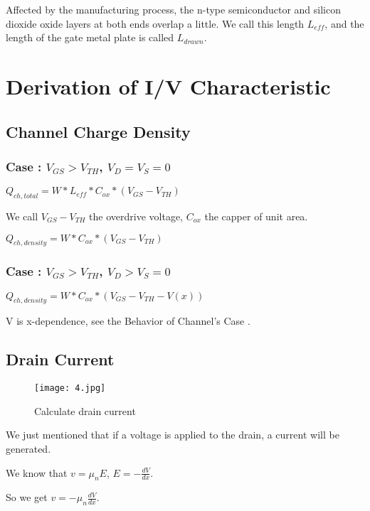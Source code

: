 \documentclass[fontset=windows]{article}
\begin{document}
Affected by the manufacturing process, the n-type semiconductor and silicon dioxide oxide layers at both ends overlap a little.
We call this length $L_{eff}$, and the length of the gate metal plate is called $L_{drawn}$.

\section*{Derivation of I/V Characteristic}

\subsection*{Channel Charge Density}

\subsubsection*{Case \uppercase\expandafter{}: $V_{GS}>V_{TH}$, $V_D=V_S=0$}

$Q_{ch,total}=W*L_{eff}*C_{ox}*(V_{GS}-V_{TH})$

We call $V_{GS}-V_{TH}$ the overdrive voltage, $C_{ox}$ the capper of unit area.

$Q_{ch,density}=W*C_{ox}*(V_{GS}-V_{TH})$

\subsubsection*{Case \uppercase\expandafter{}: $V_{GS}>V_{TH}$, $V_D>V_S=0$}

$Q_{ch,density}=W*C_{ox}*(V_{GS}-V_{TH}-V(x))$

V is x-dependence, see the Behavior of Channel's Case \uppercase\expandafter{}.

\subsection*{Drain Current}

\begin{figure}[htbp]
    \centering
    \texttt{[image: 4.jpg]}
    \captionsetup{labelformat=empty}
    \caption{Calculate drain current}
    \label{4}
\end{figure}

We just mentioned that if a voltage is applied to the drain, a current will be generated.

We know that $v=\mu_{n}E$, $E=-\frac{dV}{dx}$.

So we get $v=-\mu_{n}\frac{dV}{dx}$.
\end{document}
